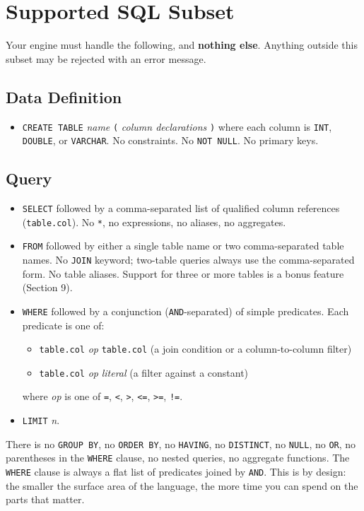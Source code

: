 \documentclass[11pt,a4paper]{article}
\begin{document}
\section{Supported SQL Subset}

Your engine must handle the following, and \textbf{nothing else}. Anything outside this subset may be rejected with an error message.

\subsection{Data Definition}
\begin{itemize}
\item \texttt{CREATE TABLE} \textit{name} \texttt{(} \textit{column declarations} \texttt{)} where each column is \texttt{INT}, \texttt{DOUBLE}, or \texttt{VARCHAR}. No constraints. No \texttt{NOT NULL}. No primary keys.
\end{itemize}

\subsection{Query}
\begin{itemize}
\item \texttt{SELECT} followed by a comma-separated list of qualified column references (\texttt{table.col}). No \texttt{*}, no expressions, no aliases, no aggregates.
\item \texttt{FROM} followed by either a single table name or two comma-separated table names. No \texttt{JOIN} keyword; two-table queries always use the comma-separated form. No table aliases. Support for three or more tables is a bonus feature (Section 9).
\item \texttt{WHERE} followed by a conjunction (\texttt{AND}-separated) of simple predicates. Each predicate is one of:
  \begin{itemize}
  \item \texttt{table.col} \textit{op} \texttt{table.col} (a join condition or a column-to-column filter)
  \item \texttt{table.col} \textit{op} \textit{literal} (a filter against a constant)
  \end{itemize}
  where \textit{op} is one of \texttt{=}, \texttt{<}, \texttt{>}, \texttt{<=}, \texttt{>=}, \texttt{!=}.
\item \texttt{LIMIT} \textit{n}.
\end{itemize}

There is no \texttt{GROUP BY}, no \texttt{ORDER BY}, no \texttt{HAVING}, no \texttt{DISTINCT}, no \texttt{NULL}, no \texttt{OR}, no parentheses in the \texttt{WHERE} clause, no nested queries, no aggregate functions. The \texttt{WHERE} clause is always a flat list of predicates joined by \texttt{AND}. This is by design: the smaller the surface area of the language, the more time you can spend on the parts that matter.
\end{document}
